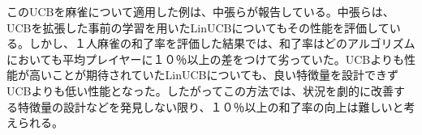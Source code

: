 このUCBを麻雀について適用した例は、中張ら\cite{LinUCB_mahjong}が報告している。中張らは、UCBを拡張した事前の学習を用いたLinUCBについてもその性能を評価している。しかし、１人麻雀の和了率を評価した結果では、和了率はどのアルゴリズムにおいても平均プレイヤーに１０％以上の差をつけて劣っていた。UCBよりも性能が高いことが期待されていたLinUCBについても、良い特徴量を設計できずUCBよりも低い性能となった。したがってこの方法では、状況を劇的に改善する特徴量の設計などを発見しない限り、１０％以上の和了率の向上は難しいと考えられる。



